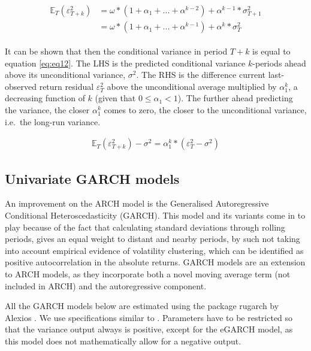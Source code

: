 \documentclass[a4paper, twoside]{templates/ociamthesis}
\begin{document}
\begin{align} 
\begin{split}
\mathbb{E}_T(\varepsilon_{T+k}^2) 
&= \omega*(1+\alpha_1 + ... + \alpha^{k-2}) + \alpha^{k-1}*\sigma_{T+1}^2 \\
&= \omega*(1+\alpha_1 + ... + \alpha^{k-1}) + \alpha^{k}*\sigma_{T}^2
\end{split}
 \label{eq:eq11}
\end{align}

It can be shown that then the conditional variance in period \(T+k\) is equal to equation \eqref{eq:eq12}. The LHS is the predicted conditional variance \(k\)-periods ahead above its unconditional variance, \(\sigma^2\). The RHS is the difference current last-observed return residual \(\varepsilon_T^2\) above the unconditional average multiplied by \(\alpha_1^k\), a decreasing function of \(k\) (given that \(0 \le\alpha_1 <1\)). The further ahead predicting the variance, the closer \(\alpha_1^k\) comes to zero, the closer to the unconditional variance, i.e.~the long-run variance.

\begin{align} 
\mathbb{E}_T(\varepsilon_{T+k}^2) - \sigma^2 = \alpha_1^k*(\varepsilon_T^2 - \sigma^2)
 \label{eq:eq12}
\end{align}

\newpage

\hypertarget{univariate-garch-models}{%
\subsection{Univariate GARCH models}\label{univariate-garch-models}}

An improvement on the ARCH model is the Generalised Autoregressive Conditional Heteroscedasticity (GARCH). This model and its variants come in to play because of the fact that calculating standard deviations through rolling periods, gives an equal weight to distant and nearby periods, by such not taking into account empirical evidence of volatility clustering, which can be identified as positive autocorrelation in the absolute returns. GARCH models are an extension to ARCH models, as they incorporate both a novel moving average term (not included in ARCH) and the autoregressive component.

All the GARCH models below are estimated using the package rugarch by Alexios \textcite{alexios2020}. We use specifications similar to \textcite{ghalanos2020}. Parameters have to be restricted so that the variance output always is positive, except for the eGARCH model, as this model does not mathematically allow for a negative output.
\end{document}
